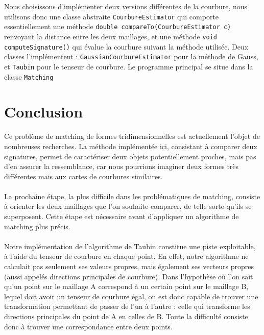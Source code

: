 \documentclass{llncs}
\begin{document}
Nous choisissons d'implémenter deux versions différentes de la courbure, nous utilisons donc une classe abstraite \texttt{CourbureEstimator} qui comporte essentiellement une méthode \texttt{double compareTo(CourbureEstimator c)} renvoyant la distance entre les deux maillages, et une méthode \texttt{void computeSignature()} qui évalue la courbure suivant la méthode utilisée. Deux classes l'implémentent : \texttt{GaussianCourbureEstimator} pour la méthode de Gauss, et \texttt{Taubin} pour le tenseur de courbure. Le programme principal se situe dans la classe \texttt{Matching}

\section{Conclusion}

Ce problème de matching de formes tridimensionnelles est actuellement l'objet de nombreuses recherches. La méthode implémentée ici, consistant à comparer deux signatures, permet de caractériser deux objets potentiellement proches, mais pas d'en assurer la ressemblance, car nous pourrions imaginer deux formes très différentes mais aux cartes de courbures similaires.
\\\\
La prochaine étape, la plus difficile dans les problématiques de matching, consiste à orienter les deux maillages que l'on souhaite comparer, de telle sorte qu'ils se superposent. Cette étape est nécessaire avant d’appliquer un algorithme de matching plus précis.
\\\\
Notre implémentation de l’algorithme de Taubin constitue une piste exploitable, à l’aide du tenseur de courbure en chaque point. En effet, notre algorithme ne calculait pas seulement ses valeurs propres, mais également ses vecteurs propres (aussi appelés directions principales de courbure). Dans l’hypothèse où l’on sait qu’un point sur le maillage A correspond à un certain point sur le maillage B, lequel doit avoir un tenseur de courbure égal, on est donc capable de trouver une transformation permettant de passer de l’un à l’autre : celle qui transforme les directions principales du point de A en celles de B. Toute la difficulté consiste donc à trouver une correspondance entre deux points.



\end{document}
